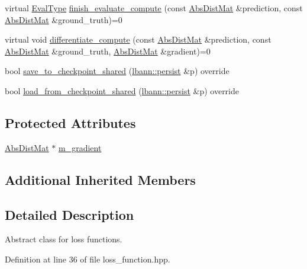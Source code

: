 \begin{DoxyCompactItemize}
\item 
virtual \hyperlink{base_8hpp_a3266f5ac18504bbadea983c109566867}{Eval\+Type} \hyperlink{classlbann_1_1loss__function_a3ea8553a4e9c75477d7d4fc533c4d4fd}{finish\+\_\+evaluate\+\_\+compute} (const \hyperlink{base_8hpp_a9a697a504ae84010e7439ffec862b470}{Abs\+Dist\+Mat} \&prediction, const \hyperlink{base_8hpp_a9a697a504ae84010e7439ffec862b470}{Abs\+Dist\+Mat} \&ground\+\_\+truth)=0
\item 
virtual void \hyperlink{classlbann_1_1loss__function_aefccc2b4f5a02664002d12630cf369e7}{differentiate\+\_\+compute} (const \hyperlink{base_8hpp_a9a697a504ae84010e7439ffec862b470}{Abs\+Dist\+Mat} \&prediction, const \hyperlink{base_8hpp_a9a697a504ae84010e7439ffec862b470}{Abs\+Dist\+Mat} \&ground\+\_\+truth, \hyperlink{base_8hpp_a9a697a504ae84010e7439ffec862b470}{Abs\+Dist\+Mat} \&gradient)=0
\item 
bool \hyperlink{classlbann_1_1loss__function_ac44929838f3c3f0a34e1532530422dad}{save\+\_\+to\+\_\+checkpoint\+\_\+shared} (\hyperlink{classlbann_1_1persist}{lbann\+::persist} \&p) override
\item 
bool \hyperlink{classlbann_1_1loss__function_ae948babd62a110e2407271f24dcaec1b}{load\+\_\+from\+\_\+checkpoint\+\_\+shared} (\hyperlink{classlbann_1_1persist}{lbann\+::persist} \&p) override
\end{DoxyCompactItemize}
\subsection*{Protected Attributes}
\begin{DoxyCompactItemize}
\item 
\hyperlink{base_8hpp_a9a697a504ae84010e7439ffec862b470}{Abs\+Dist\+Mat} $\ast$ \hyperlink{classlbann_1_1loss__function_ac6ac9f8f2cef7a4daa1b282dba914975}{m\+\_\+gradient}
\end{DoxyCompactItemize}
\subsection*{Additional Inherited Members}


\subsection{Detailed Description}
Abstract class for loss functions. 

Definition at line 36 of file loss\+\_\+function.\+hpp.



